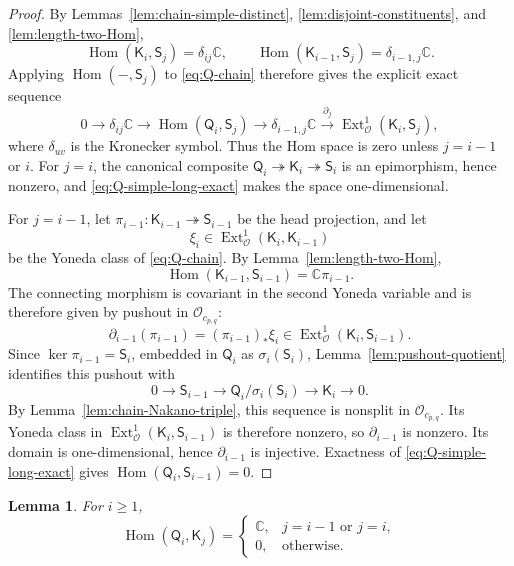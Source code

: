 \documentclass[12pt,leqno]{amsart}
\numberwithin{equation}{section}
\newtheorem{lem}[thm]{Lemma}
\newcommand{\Hom}{\operatorname{Hom}}
\newcommand{\Ext}{\operatorname{Ext}}
\newcommand{\Oc}{\mathcal O}
\def\C{\mathbb{C}}
\begin{document}
\begin{proof}
By Lemmas~\ref{lem:chain-simple-distinct},
\ref{lem:disjoint-constituents}, and \ref{lem:length-two-Hom},
\[
 \Hom(\mathsf K_i,\mathsf S_j)=\delta_{ij}\C,\qquad
 \Hom(\mathsf K_{i-1},\mathsf S_j)=\delta_{i-1,j}\C.
\]
Applying $\Hom(-,\mathsf S_j)$ to \eqref{eq:Q-chain} therefore gives the
explicit exact sequence
\begin{equation}\label{eq:Q-simple-long-exact}
 0\to \delta_{ij}\C
 \to\Hom(\mathsf Q_i,\mathsf S_j)
 \to\delta_{i-1,j}\C
 \xrightarrow{\partial_j}\Ext^1_{\Oc}(\mathsf K_i,\mathsf S_j),
\end{equation}
where $\delta_{uv}$ is the Kronecker symbol.  Thus the Hom space is zero
unless $j=i-1$ or $i$.  For $j=i$, the canonical composite
$\mathsf Q_i\twoheadrightarrow\mathsf K_i\twoheadrightarrow\mathsf S_i$
is an epimorphism, hence nonzero, and
\eqref{eq:Q-simple-long-exact} makes the space one-dimensional.

For $j=i-1$, let
$\pi_{i-1}:\mathsf K_{i-1}\twoheadrightarrow\mathsf S_{i-1}$ be the
head projection, and let
\[
 \xi_i\in\Ext^1_{\Oc}(\mathsf K_i,\mathsf K_{i-1})
\]
be the Yoneda class of \eqref{eq:Q-chain}.  By
Lemma~\ref{lem:length-two-Hom},
\[
 \Hom(\mathsf K_{i-1},\mathsf S_{i-1})=\C\pi_{i-1}.
\]
The connecting morphism is covariant in the second Yoneda variable and is
therefore given by pushout in $\Oc_{c_{p,q}}$:
\[
 \partial_{i-1}(\pi_{i-1})=(\pi_{i-1})_*\xi_i
 \in\Ext^1_{\Oc}(\mathsf K_i,\mathsf S_{i-1}).
\]
Since $\ker\pi_{i-1}=\mathsf S_i$, embedded in $\mathsf Q_i$ as
$\sigma_i(\mathsf S_i)$, Lemma~\ref{lem:pushout-quotient} identifies this
pushout with
\[
 0\longrightarrow\mathsf S_{i-1}\longrightarrow
 \mathsf Q_i/\sigma_i(\mathsf S_i)\longrightarrow\mathsf K_i
 \longrightarrow0.
\]
By Lemma~\ref{lem:chain-Nakano-triple}, this sequence is nonsplit in
$\Oc_{c_{p,q}}$.  Its Yoneda class in
$\Ext^1_{\Oc}(\mathsf K_i,\mathsf S_{i-1})$ is therefore nonzero, so
$\partial_{i-1}$ is nonzero.  Its domain is
one-dimensional, hence $\partial_{i-1}$ is injective.  Exactness of \eqref{eq:Q-simple-long-exact} gives
$\Hom(\mathsf Q_i,\mathsf S_{i-1})=0$.
\end{proof}

\begin{lem}\label{lem:Q-Kac-Hom}
For $i\geq1$,
\[
 \Hom(\mathsf Q_i,\mathsf K_j)=
 \begin{cases}
  \C,&j=i-1\text{ or }j=i,\\
  0,&\text{otherwise}.
 \end{cases}
\]
\end{lem}
\end{document}
